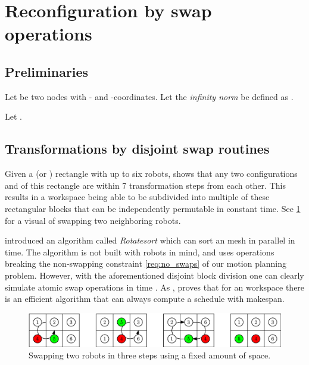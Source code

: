 \section{Reconfiguration by swap operations}

\subsection{Preliminaries}

Let  be two nodes with - and -coordinates. Let the \emph{infinity norm} be defined as .

Let .

\subsection{Transformations by disjoint swap routines}

Given a  (or ) rectangle with up to six robots, \cite{siamcomp/DemaineFKMS19} shows that any two configurations  and  of this rectangle are within 7 transformation steps from each other. This results in a workspace being able to be subdivided into multiple of these rectangular blocks that can be independently permutable in constant time. See \cref{fig:swap3} for a visual of swapping two neighboring robots.

\cite{algorithmica/MarbergG88} introduced an algorithm called \emph{Rotatesort} which can sort an  mesh in parallel in  time. The algorithm is not built with robots in mind, and uses operations breaking the non-swapping constraint \cref{req:no_swaps} of our motion planning problem. However, with the aforementioned disjoint block division one can clearly simulate atomic swap operations in  time \cite{siamcomp/DemaineFKMS19}. As , \cite{siamcomp/DemaineFKMS19} proves that for an  workspace there is an efficient algorithm that can always compute a schedule with  makespan.

\begin{figure}[h]
	\centering
	\includegraphics[width=0.8\linewidth]{ipe/swap3.eps}
	\caption{
		Swapping two robots in three steps using a fixed amount of space.
	}\label{fig:swap3}
\end{figure}

